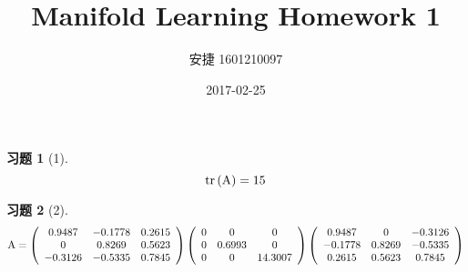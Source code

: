 \documentclass[12pt, oneside]{article}
\title{Manifold Learning Homework 1}
\author{安捷 1601210097}
\date{2017-02-25}
\newtheorem*{exercise}{\textbf{习题}}
\begin{document}
  \maketitle

  \begin{exercise}[1]
	\begin{equation*} 
	  \operatorname{tr}\left(\rm{A} \right) = 15
	\end{equation*}
  \end{exercise}

  \begin{exercise}[2]
	\scriptsize
	\begin{equation*}
	  \rm{A} = 
	  \left( 
	  \begin{array}{ccc}
		0.9487 & -0.1778 & 0.2615 \\
		0 & 0.8269 & 0.5623 \\
		-0.3126 & -0.5335 & 0.7845 \\
	  \end{array}
	  \right)
	  \left( 
	  \begin{array}{ccc}
		0 & 0 & 0 \\
		0 & 0.6993 & 0 \\
		0 & 0 & 14.3007 \\
	  \end{array}
	  \right)
	  \left( 
	  \begin{array}{ccc}
		0.9487 & 0 & -0.3126 \\
		-0.1778 & 0.8269 & -0.5335 \\
		0.2615 & 0.5623 & 0.7845 \\
	  \end{array}
	  \right)
	\end{equation*}
  \end{exercise}
\end{document}
